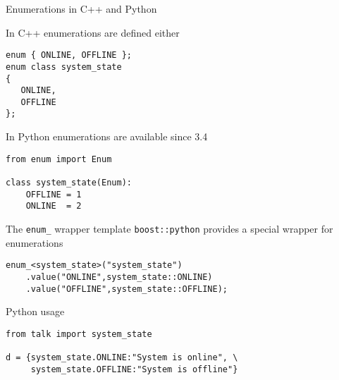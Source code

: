 
\begin{frame}[fragile]{Enumerations in C++ and Python}

    In C++ enumerations are defined either
    \begin{verbatim}
enum { ONLINE, OFFLINE };
enum class system_state
{ 
   ONLINE, 
   OFFLINE 
};
    \end{verbatim}

    \vspace{0.1\textheight}
    In Python enumerations are available since 3.4
    \begin{verbatim}
from enum import Enum

class system_state(Enum):
    OFFLINE = 1
    ONLINE  = 2
    \end{verbatim}
\end{frame}

\begin{frame}[fragile]{The \texttt{enum\_} wrapper template}
    \texttt{boost::python} provides a special wrapper for enumerations
    \vspace{0.025\textheight}
    \begin{verbatim}
enum_<system_state>("system_state")
    .value("ONLINE",system_state::ONLINE)
    .value("OFFLINE",system_state::OFFLINE);
    \end{verbatim}
    \vspace{0.1\textheight}
    Python usage
    \vspace{0.025\textheight}
    \begin{verbatim}
from talk import system_state

d = {system_state.ONLINE:"System is online", \
     system_state.OFFLINE:"System is offline"}
    \end{verbatim}


\end{frame}

